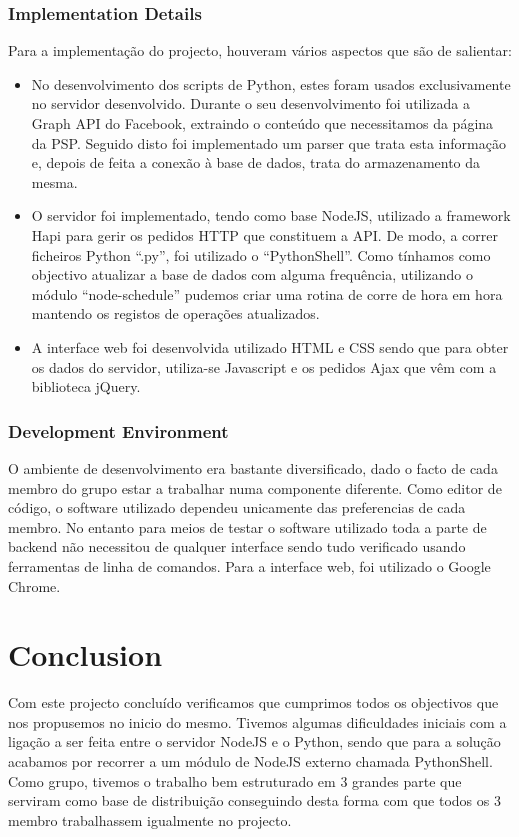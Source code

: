 \documentclass[12pt]{article}
\begin{document}
\subsubsection{Implementation Details}
Para a implementação do projecto, houveram vários aspectos que são de salientar:
\begin{itemize}
	\item No desenvolvimento dos scripts de Python, estes foram usados exclusivamente no servidor desenvolvido. Durante o seu desenvolvimento foi utilizada a Graph API do Facebook, extraindo o conteúdo que necessitamos da página da PSP. Seguido disto foi implementado um parser que trata esta informação e, depois de feita a conexão à base de dados, trata do armazenamento da mesma.
	\item O servidor foi implementado, tendo como base NodeJS, utilizado a framework Hapi para gerir os pedidos HTTP que constituem a API. De modo, a correr ficheiros Python “.py”, foi utilizado o “PythonShell”. Como tínhamos como objectivo atualizar a base de dados com alguma frequência, utilizando o módulo “node-schedule” pudemos criar uma rotina de corre de hora em hora mantendo os registos de operações atualizados.
	\item A interface web foi desenvolvida utilizado HTML e CSS sendo que para obter os dados do servidor, utiliza-se Javascript e os pedidos Ajax que vêm com a biblioteca jQuery.
\end{itemize}
\subsubsection{Development Environment}
O ambiente de desenvolvimento era bastante diversificado, dado o facto de cada membro do grupo estar a trabalhar numa componente diferente. Como editor de código, o software utilizado dependeu unicamente das preferencias de cada membro. No entanto para meios de testar o software utilizado toda a parte de backend não necessitou de qualquer interface sendo tudo verificado usando ferramentas de linha de comandos. Para a interface web, foi utilizado o Google Chrome.

\newpage
\section{Conclusion}
Com este projecto concluído verificamos que cumprimos todos os objectivos que nos propusemos no inicio do mesmo. Tivemos algumas dificuldades iniciais com a ligação a ser feita entre o servidor NodeJS e o Python, sendo que para a solução acabamos por recorrer a um módulo de NodeJS externo chamada PythonShell. Como grupo, tivemos o trabalho bem estruturado em 3 grandes parte que serviram como base de distribuição conseguindo desta forma com que todos os 3 membro trabalhassem igualmente no projecto.
\end{document}
